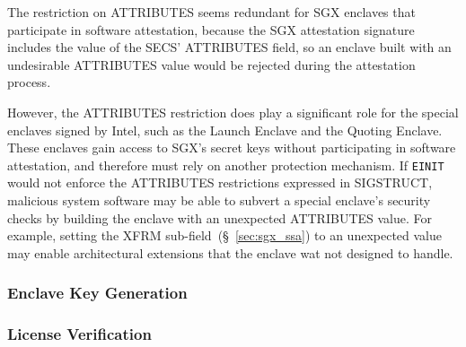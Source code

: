 The restriction on ATTRIBUTES seems redundant for SGX enclaves that participate
in software attestation, because the SGX attestation signature includes the
value of the SECS' ATTRIBUTES field, so an enclave built with an undesirable
ATTRIBUTES value would be rejected during the attestation process.


However, the ATTRIBUTES restriction does play a significant role for the
special enclaves signed by Intel, such as the Launch Enclave and the Quoting
Enclave. These enclaves gain access to SGX's secret keys without participating
in software attestation, and therefore must rely on another protection
mechanism. If \texttt{EINIT} would not enforce the ATTRIBUTES restrictions
expressed in SIGSTRUCT, malicious system software may be able to subvert a
special enclave's security checks by building the enclave with an unexpected
ATTRIBUTES value. For example, setting the XFRM
sub-field~(\S~\ref{sec:sgx_ssa}) to an unexpected value may enable
architectural extensions that the enclave wat not designed to handle.


\subsubsection{Enclave Key Generation}
\label{sec:sgx_egetkey}





\subsubsection{License Verification}
\label{sec:sgx_launch_enclave}


